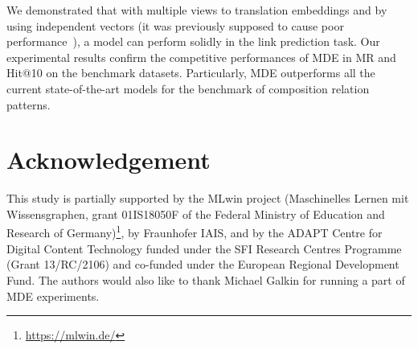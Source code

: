\documentclass{ecai}
\begin{document}
We demonstrated that with multiple views to translation embeddings and by using independent vectors (it was previously supposed to cause poor performance~\cite{trouillon2017knowledge,kazemi2018simple}), a model can perform solidly in the link prediction task.
Our experimental results confirm the competitive performances of MDE in MR and Hit@10 on the benchmark datasets. Particularly, MDE outperforms all the current state-of-the-art models for the benchmark of composition relation patterns. 

\clearpage 

\section*{Acknowledgement}
This study is partially supported by the MLwin project (Maschinelles Lernen mit Wissensgraphen, grant 01IS18050F of the Federal Ministry of Education and Research of Germany)\footnote{\url{https://mlwin.de/}}, by Fraunhofer IAIS, and by the ADAPT Centre for Digital Content Technology funded under the SFI Research Centres Programme (Grant 13/RC/2106) and co-funded under the European Regional Development Fund. The authors would also like to thank Michael Galkin for running a part of MDE experiments.



















\newpage
\appendix
\end{document}
